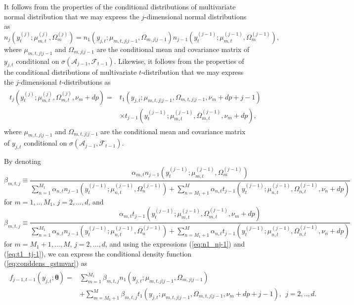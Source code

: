 \documentclass[nojss]{jss} %
\begin{document}
\begin{appendix}
It follows from the properties of the conditional distributions of multivariate normal distribution that we may express the $j$-dimensional normal distributions as
\begin{equation}\label{eq:n1_nj-1}
n_j(y_{t}^{(j)};\mu_{m,t}^{(j)},\Omega_m^{(j)}) = n_1(y_{j,t};\mu_{m,t,j|j-1},\Omega_{m,j|j-1}) n_{j-1}(y_{t}^{(j-1)};\mu_{m,t}^{(j-1)},\Omega_m^{(j-1)}),
\end{equation}
where $\mu_{m,t,j|j-1}$ and $\Omega_{m,j|j-1}$ are the conditional mean and covariance matrix of $y_{j,t}$ conditional on $\sigma(\mathcal{A}_{j-1},\mathcal{F}_{t-1})$.  Likewise, it follows from the properties of the conditional distributions of multivariate $t$-distribution that we may express the $j$-dimensional $t$-distributions as
\begin{align}\label{eq:t1_tj-1}
\begin{aligned}
t_j(y_{t}^{(j)};\mu_{m,t}^{(j)},\Omega_{m,t}^{(j)},\nu_m + dp) =& t_1(y_{j,t};\mu_{m,t,j|j-1},\Omega_{m,t,j|j-1},\nu_m + dp + j  - 1) \\
&\times t_{j-1}(y_{t}^{(j-1)};\mu_{m,t}^{(j-1)},\Omega_{m,t}^{(j-1)},\nu_m + dp),
\end{aligned}
\end{align}
where $\mu_{m,t,j|j-1}$ and $\Omega_{m,t,j|j-1}$ are the conditional mean and covariance matrix of $y_{j,t}$ conditional on $\sigma(\mathcal{A}_{j-1},\mathcal{F}_{t-1})$.

By denoting
\begin{equation}\label{eq:beta_mtj_t}
\beta_{m,t,j} \equiv \frac{\alpha_{m,t}n_{j-1}(y_{t}^{(j-1)};\mu_{m,t}^{(j-1)},\Omega_{m}^{(j-1)})}{\sum_{n=1}^{M_1}\alpha_{n,t} n_{j-1}(y_{t}^{(j-1)};\mu_{n,t}^{(j-1)},\Omega_{n}^{(j-1)}) +\sum_{n=M_1+1}^{M}\alpha_{n,t} t_{j-1}(y_{t}^{(j-1)};\mu_{n,t}^{(j-1)},\Omega_{n,t}^{(j-1)},\nu_n + dp)}
\end{equation}
for $m=1,..,M_1$,  $j=2,...,d$,  and
\begin{equation}\label{eq:beta_mtj_t}
\beta_{m,t,j} \equiv \frac{\alpha_{m,t}t_{j-1}(y_{t}^{(j-1)};\mu_{m,t}^{(j-1)},\Omega_{m,t}^{(j-1)},\nu_m + dp)}{\sum_{n=1}^{M_1}\alpha_{n,t} n_{j-1}(y_{t}^{(j-1)};\mu_{n,t}^{(j-1)},\Omega_{n}^{(j-1)}) +\sum_{n=M_1+1}^{M}\alpha_{n,t} t_{j-1}(y_{t}^{(j-1)};\mu_{n,t}^{(j-1)},\Omega_{n,t}^{(j-1)},\nu_n + dp)}
\end{equation}
for $m=M_1+1,...,M$,  $j=2,...,d$, and using the expressions (\ref{eq:n1_nj-1}) and (\ref{eq:t1_tj-1}),  we can express the conditional density function (\ref{eq:conddens_gstmvar}) as
\begin{align}
\begin{aligned}
f_{j-1,t-1}\left(y_{j,t};\boldsymbol{\theta}\right)=&\sum_{m=1}^{M_1}\beta_{m,t,j}n_1(y_{j,t};\mu_{m,t,j|j-1},\Omega_{m,j|j-1})\\
& + \sum_{m=M_1+1}^{M}\beta_{m,t,j}t_1(y_{j,t};\mu_{m,t,j|j-1},\Omega_{m,t,j|j-1},\nu_m + dp + j - 1), \ \ j=2,..,d.
\end{aligned}
\end{align}


\end{appendix}
\end{document}
